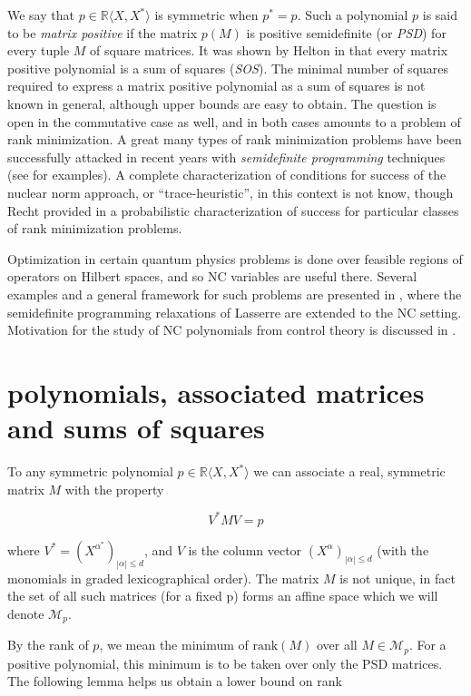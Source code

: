 \documentclass[11pt]{amsart}
\begin{document}
We say that $p \in \mathbb{R}\langle X, X^* \rangle$ is symmetric when $p^*=p$.  Such a polynomial $p$ is said to be \emph{matrix positive} if the matrix $p(M)$ is positive semidefinite (or \emph{PSD}) for every tuple $M$ of square matrices.  It was shown by Helton in \cite{HE} that every matrix positive polynomial is a sum of squares (\emph{SOS}).  The minimal number of squares required to express a matrix positive polynomial as a sum of squares is not known in general, although upper bounds are easy to obtain.  The question is open in the commutative case as well, and in both cases amounts to a problem of rank minimization. A great many types of rank minimization problems have been successfully attacked in recent years with \emph{semidefinite programming} techniques (see \cite{FAZ} for examples).  A complete characterization of conditions for success of the nuclear norm approach, or ``trace-heuristic'', in this context is not know, though Recht provided in \cite{DBLP:conf/cdc/RechtXH08} a probabilistic characterization of success for particular classes of rank minimization problems.

Optimization in certain quantum physics problems is done over feasible regions of operators on Hilbert spaces, and so NC variables are useful there. Several examples and a general framework for such problems are presented in \cite{PIR}, where the semidefinite programming relaxations of Lasserre are extended to the NC setting. Motivation for the study of NC polynomials from control theory is discussed in \cite{HE2}.

\section{polynomials, associated matrices and sums of squares}

To any symmetric polynomial $p \in \mathbb{R}\langle X, X^* \rangle$ we can associate a real, symmetric matrix $M$ with the property

\[ V^*MV=p\]

where $V^*=(X^{\alpha^*})_{|\alpha|\leq d}$, and $V$ is the column vector $(X^{\alpha})_{|\alpha|\leq d}$ (with the monomials in graded lexicographical order). The matrix $M$ is not unique, in fact the set of all such matrices (for a fixed p) forms an affine space which we will denote $\mathcal M_p$.

By the rank of $p$, we mean the minimum of $\text{rank}(M)$ over all $M\in \mathcal {M}_p$.  For a positive polynomial, this minimum is to be taken over only the PSD matrices.  The following lemma helps us obtain a lower bound on rank
\end{document}
